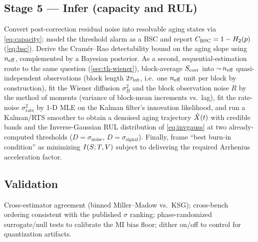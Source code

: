 \subsection{Stage 5 --- Infer (capacity and RUL)}
Convert post-correction residual noise into resolvable aging states via
\cref{eq:capacity}; model the threshold alarm as a BSC and report
$C_{\mathrm{BSC}}=1-H_2(p)$ (\cref{eq:bsc}). Derive the Cram\'er--Rao detectability bound on
the aging slope using $n_{\mathrm{eff}}$, complemented by a Bayesian posterior. As a
second, sequential-estimation route to the same question
(\cref{sec:th-wiener}), block-average $S_{\mathrm{corr}}$ into $\sim\!n_{\mathrm{eff}}$
quasi-independent observations (block length $2\tau_{\mathrm{int}}$, i.e.\ one $n_{\mathrm{eff}}$
unit per block by construction), fit the Wiener diffusion $\sigma_B^2$ and the
block observation noise $R$ by the method of moments (variance of block-mean
increments vs.\ lag), fit the rate-noise $\sigma_{\mathrm{rate}}^2$ by 1-D MLE
on the Kalman filter's innovation likelihood, and run a Kalman/RTS smoother to
obtain a denoised aging trajectory $\hat{X}(t)$ with credible bands and the
Inverse-Gaussian RUL distribution of \cref{eq:invgauss} at two
already-computed thresholds ($D=\sigma_{\text{noise}}$,
$D=\sigma_{\text{signal}}$). Finally, frame ``best burn-in condition'' as
minimizing $I\!\left(S ; T,V\right)$ subject to delivering the required Arrhenius
acceleration factor.

\subsection{Validation}
Cross-estimator agreement (binned Miller--Madow vs.\ KSG); cross-bench ordering
consistent with the published $\sigma$ ranking; phase-randomized surrogate/null
tests to calibrate the MI bias floor; dither on/off to control for quantization
artifacts.
